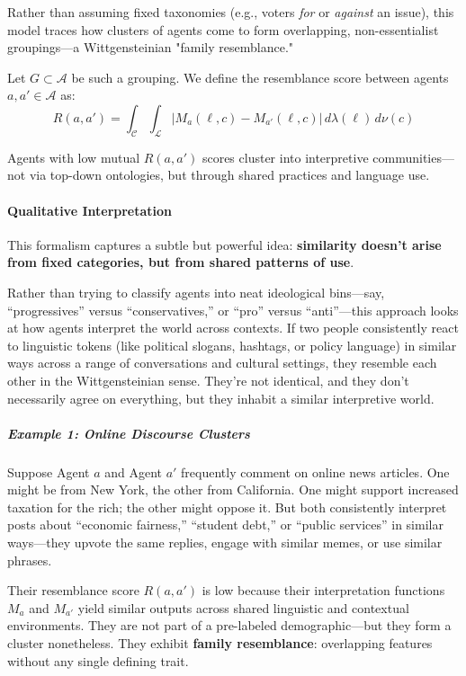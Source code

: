 Rather than assuming fixed taxonomies (e.g., voters \textit{for} or \textit{against} an issue), this model traces how clusters of agents come to form overlapping, non-essentialist groupings—a Wittgensteinian "family resemblance."

Let \( G \subset \mathcal{A} \) be such a grouping. We define the resemblance score between agents \( a, a' \in \mathcal{A} \) as:
\[
R(a, a') = \int_{\mathcal{C}} \int_{\mathcal{L}} |M_a(\ell, c) - M_{a'}(\ell, c)| \, d\lambda(\ell) \, d\nu(c)
\]

Agents with low mutual \( R(a, a') \) scores cluster into interpretive communities—not via top-down ontologies, but through shared practices and language use.

\paragraph{Qualitative Interpretation}

This formalism captures a subtle but powerful idea: \textbf{similarity doesn’t arise from fixed categories, but from shared patterns of use}.

Rather than trying to classify agents into neat ideological bins---say, “progressives” versus “conservatives,” or “pro” versus “anti”—this approach looks at how agents interpret the world across contexts. If two people consistently react to linguistic tokens (like political slogans, hashtags, or policy language) in similar ways across a range of conversations and cultural settings, they resemble each other in the Wittgensteinian sense. They’re not identical, and they don’t necessarily agree on everything, but they inhabit a similar interpretive world.

\subparagraph{Example 1: Online Discourse Clusters}

Suppose Agent \( a \) and Agent \( a' \) frequently comment on online news articles. One might be from New York, the other from California. One might support increased taxation for the rich; the other might oppose it. But both consistently interpret posts about “economic fairness,” “student debt,” or “public services” in similar ways—they upvote the same replies, engage with similar memes, or use similar phrases.

Their resemblance score \( R(a, a') \) is low because their interpretation functions \( M_a \) and \( M_{a'} \) yield similar outputs across shared linguistic and contextual environments. They are not part of a pre-labeled demographic—but they form a cluster nonetheless. They exhibit \textbf{family resemblance}: overlapping features without any single defining trait.

